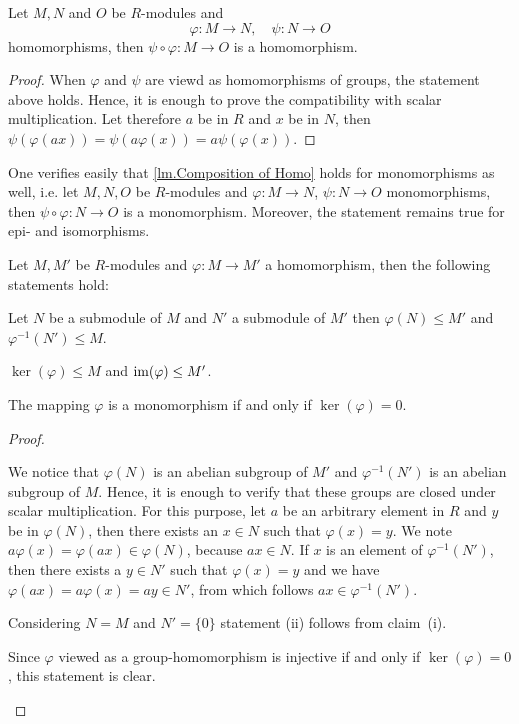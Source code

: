 \begin{lem}\label{lm.Composition of Homo} 
Let $M, N$ and $O$ be $R$-modules and
     \[\varphi\colon M\rightarrow N, \quad \psi\colon N\rightarrow O\] 
homomorphisms, then $\psi\circ\varphi\colon M\rightarrow O$ is a homomorphism.
\end{lem}
\begin{proof}
When $\varphi$ and $\psi$ are viewd as homomorphisms of groups, the statement above holds. Hence, it is enough to prove the compatibility with scalar multiplication. Let therefore $a$ be in $R$ and $x$ be in $N$, then $\psi(\varphi(ax))=\psi(a\varphi(x))=a\psi(\varphi(x))$.
\end{proof}

One verifies easily that \cref{lm.Composition of Homo} holds for monomorphisms as well, i.e. let $M, N, O$ be $R$-modules and $\varphi\colon M\rightarrow N$, $\psi\colon N\rightarrow O$ monomorphisms, then $\psi\circ\varphi\colon N\rightarrow O$ is a monomorphism. Moreover, the statement remains true for epi- and isomorphisms.

\begin{lem}
Let $M,M'$ be $R$-modules and $\varphi\colon M\rightarrow M'$ a homomorphism, then the following statements hold:
\begin{thmlist}
\item Let $N$ be a submodule of $M$ and $N'$ a submodule of $M'$ then $\varphi(N)\leq M'$ and $\varphi^{-1}(N') \leq M$.
\item $\ker(\varphi)\leq M$ and $\operatorname{im}(\varphi)\leq M'$.
\item The mapping $\varphi$ is a monomorphism if and only if $\ker(\varphi)={0}$.
\end{thmlist}
\end{lem}
\begin{proof}
\begin{plist}
\item We notice that $\varphi(N)$ is an abelian subgroup of $M'$ and $\varphi^{-1}(N')$ is an abelian subgroup of $M$. Hence, it is enough to verify that these groups are closed under scalar multiplication. For this purpose, let $a$ be an arbitrary element in $R$ and $y$ be in $\varphi(N)$, then there exists an $x\in N$ such that $\varphi(x)=y$. We note $a\varphi(x)=\varphi(ax)\in\varphi(N)$, because $ax\in N$. If $x$ is an element of $\varphi^{-1}(N')$, then there exists a $y\in N'$ such that $\varphi(x)=y$ and we have $\varphi(ax)=a\varphi(x)=ay\in N'$, from which follows $ax\in \varphi^{-1}(N')$.
\item Considering $N=M$ and $N'=\lbrace 0\rbrace$ statement (ii) follows from claim~(i).
\item Since $\varphi$ viewed as a group-homomorphism is injective if and only if $\ker(\varphi)={0}$, this statement is clear.
\end{plist}
\end{proof}

